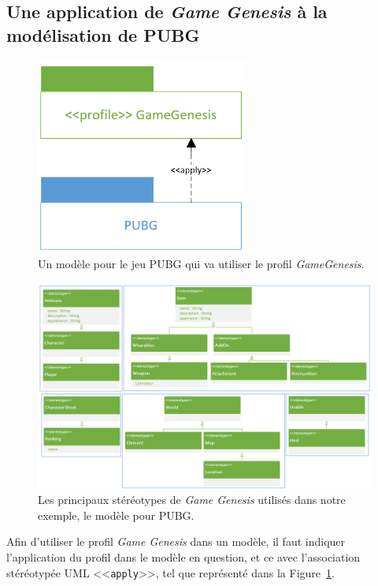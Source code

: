 \subsection{Une application de \emph{Game Genesis} à la modélisation de PUBG}

\begin{figure}
    \centering
    \includegraphics[width=7cm]{10_img/chap6/profile_gg_apply_pubg.PNG}
    \caption{Un modèle pour le jeu PUBG qui va utiliser le profil \emph{GameGenesis}.}
    \label{fig.modelisation_application}
\end{figure}

\begin{figure}
    \centering
    \includegraphics[width=\linewidth]{10_img/chap6/final_profile.PNG}
    \caption{Les principaux stéréotypes de \emph{Game Genesis} utilisés dans notre exemple, le mod\`ele pour PUBG.}
    \label{fig.racine_stereo}
\end{figure}


Afin d'utiliser le profil \emph{Game Genesis} dans un modèle, il faut indiquer l'application du profil dans le modèle en question, et ce avec l'association st\'er\'eotyp\'ee UML <<\texttt{apply}>>, tel que représenté dans la Figure~\ref{fig.modelisation_application}.


